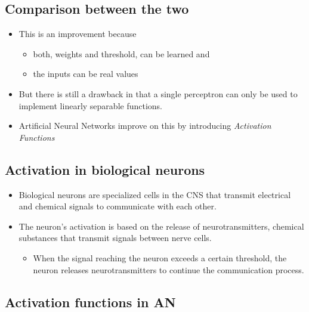 \documentclass[
  letterpaper,
  DIV=11,
  numbers=noendperiod]{scrartcl}
\providecommand{\tightlist}{%
  \setlength{\itemsep}{0pt}\setlength{\parskip}{0pt}}\usepackage{longtable,booktabs,array}
\begin{document}
\hypertarget{comparison-between-the-two-1}{%
\subsection{Comparison between the
two}\label{comparison-between-the-two-1}}

\begin{itemize}
\item
  This is an improvement because

  \begin{itemize}
  \tightlist
  \item
    both, weights and threshold, can be learned and
  \item
    the inputs can be real values
  \end{itemize}
\item
  But there is still a drawback in that a single perceptron can only be
  used to implement linearly separable functions.
\item
  Artificial Neural Networks improve on this by introducing
  \emph{Activation Functions}
\end{itemize}

\hypertarget{activation-in-biological-neurons}{%
\subsection{Activation in biological
neurons}\label{activation-in-biological-neurons}}

\begin{itemize}
\tightlist
\item
  Biological neurons are specialized cells in the CNS that transmit
  electrical and chemical signals to communicate with each other.
\item
  The neuron's activation is based on the release of neurotransmitters,
  chemical substances that transmit signals between nerve cells.

  \begin{itemize}
  \tightlist
  \item
    When the signal reaching the neuron exceeds a certain threshold, the
    neuron releases neurotransmitters to continue the communication
    process.
  \end{itemize}
\end{itemize}

\hypertarget{activation-functions-in-an}{%
\subsection{Activation functions in
AN}\label{activation-functions-in-an}}
\end{document}
